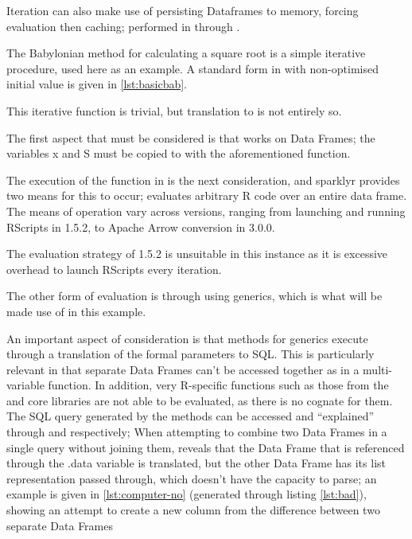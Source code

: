 Iteration can also make use of persisting  Dataframes to memory, forcing evaluation then caching; performed in  through .

The Babylonian method for calculating a square root is a simple iterative procedure, used here as an example.
A standard form in \R{} with non-optimised initial value is given in \cref{lst:basicbab}.


This iterative function is trivial, but translation to  is not entirely so.

The first aspect that must be considered is that  works on  Data Frames; the variables x and S must be copied to  with the aforementioned  function.

The execution of the function in  is the next consideration, and sparklyr provides two means for this to occur;  evaluates arbitrary R code over an entire data frame.
The means of operation vary across  versions, ranging from launching and running RScripts in  1.5.2, to Apache Arrow conversion in  3.0.0.

The evaluation strategy of 1.5.2 is unsuitable in this instance as it is excessive overhead to launch RScripts every iteration.

The other form of evaluation is through using  generics, which is what will be made use of in this example.

An important aspect of consideration is that  methods for  generics execute through a translation of the formal parameters to  SQL.
This is particularly relevant in that separate  Data Frames can't be accessed together as in a multi-variable function.
In addition, very R-specific functions such as those from the  and  core libraries are not able to be evaluated, as there is no  cognate for them.
The SQL query generated by the methods can be accessed and ``explained'' through  and  respectively; When attempting to combine two  Data Frames in a single query without joining them,  reveals that the Data Frame that is referenced through the .data variable is translated, but the other Data Frame has its list representation passed through, which  doesn't have the capacity to parse; an example is given in \cref{lst:computer-no} (generated through listing \cref{lst:bad}), showing an attempt to create a new column from the difference between two separate Data Frames

